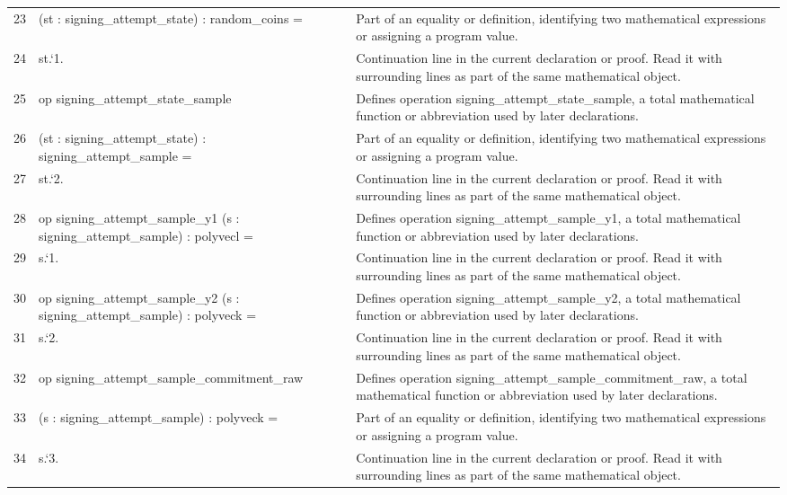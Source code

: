 \documentclass[10pt]{article}
\begin{document}
\begin{longtable}{r L{0.53\textwidth} L{0.37\textwidth}}
23 & {\ttfamily\scriptsize    (st : signing\_attempt\_state) : random\_coins =} & Part of an equality or definition, identifying two mathematical expressions or assigning a program value. \\
24 & {\ttfamily\scriptsize   st.`1.} & Continuation line in the current declaration or proof.  Read it with surrounding lines as part of the same mathematical object. \\
25 & {\ttfamily\scriptsize op signing\_attempt\_state\_sample} & Defines operation signing\_attempt\_state\_sample, a total mathematical function or abbreviation used by later declarations. \\
26 & {\ttfamily\scriptsize    (st : signing\_attempt\_state) : signing\_attempt\_sample =} & Part of an equality or definition, identifying two mathematical expressions or assigning a program value. \\
27 & {\ttfamily\scriptsize   st.`2.} & Continuation line in the current declaration or proof.  Read it with surrounding lines as part of the same mathematical object. \\
28 & {\ttfamily\scriptsize op signing\_attempt\_sample\_y1 (s : signing\_attempt\_sample) : polyvecl =} & Defines operation signing\_attempt\_sample\_y1, a total mathematical function or abbreviation used by later declarations. \\
29 & {\ttfamily\scriptsize   s.`1.} & Continuation line in the current declaration or proof.  Read it with surrounding lines as part of the same mathematical object. \\
30 & {\ttfamily\scriptsize op signing\_attempt\_sample\_y2 (s : signing\_attempt\_sample) : polyveck =} & Defines operation signing\_attempt\_sample\_y2, a total mathematical function or abbreviation used by later declarations. \\
31 & {\ttfamily\scriptsize   s.`2.} & Continuation line in the current declaration or proof.  Read it with surrounding lines as part of the same mathematical object. \\
32 & {\ttfamily\scriptsize op signing\_attempt\_sample\_commitment\_raw} & Defines operation signing\_attempt\_sample\_commitment\_raw, a total mathematical function or abbreviation used by later declarations. \\
33 & {\ttfamily\scriptsize    (s : signing\_attempt\_sample) : polyveck =} & Part of an equality or definition, identifying two mathematical expressions or assigning a program value. \\
34 & {\ttfamily\scriptsize   s.`3.} & Continuation line in the current declaration or proof.  Read it with surrounding lines as part of the same mathematical object. \\

\end{longtable}
\end{document}
